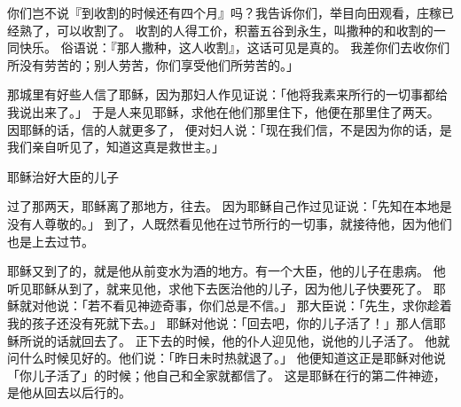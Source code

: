 {你们岂不说『到收割的时候还有四个月』吗？我告诉你们，举目向田观看，庄稼已经熟了，可以收割了。
收割的人得工价，积蓄五谷到永生，叫撒种的和收割的一同快乐。
俗语说：『那人撒种，这人收割』，这话可见是真的。
我差你们去收你们所没有劳苦的；别人劳苦，你们享受他们所劳苦的。」
\par }{\PP {}那城里有好些{}人信了耶稣，因为那妇人作见证说：「他将我素来所行的一切事都给我说出来了。」
于是{}人来见耶稣，求他在他们那里住下，他便在那里住了两天。
因耶稣的话，信的人就更多了，
便对妇人说：「现在我们信，不是因为你的话，是我们亲自听见了，知道这真是救世主。」
\par }{\SH 耶稣治好大臣的儿子
\par }{\PP {}过了那两天，耶稣离了那地方，往{}去。
因为耶稣自己作过见证说：「先知在本地是没有人尊敬的。」
到了{}，{}人既然看见他在{}过节所行的一切事，就接待他，因为他们也是上去过节。
\par }{\PP {}耶稣又到了{}的{}，就是他从前变水为酒的地方。有一个大臣，他的儿子在{}患病。
他听见耶稣从{}到了{}，就来见他，求他下去医治他的儿子，因为他儿子快要死了。
耶稣就对他说：「若不看见神迹奇事，你们总是不信。」
那大臣说：「先生，求你趁着我的孩子还没有死就下去。」
耶稣对他说：「回去吧，你的儿子活了！」那人信耶稣所说的话就回去了。
正下去的时候，他的仆人迎见他，说他的儿子活了。
他就问什么时候见好的。他们说：「昨日未时热就退了。」
他便知道这正是耶稣对他说「你儿子活了」的时候；他自己和全家就都信了。
这是耶稣在{}行的第二件神迹，是他从{}回去以后行的。

}
